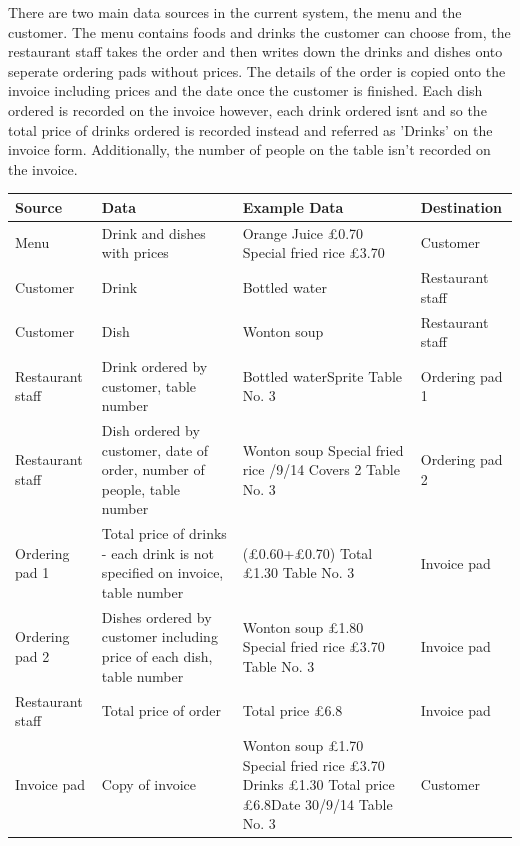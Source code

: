 There are two main data sources in the current system, the menu and the customer. The menu contains foods and drinks the customer can choose from, the restaurant staff takes the order and  then writes down the drinks and dishes onto seperate ordering pads without prices. The details of the order is copied onto the invoice including prices and the date once the customer is finished. Each dish ordered is recorded on the invoice however, each drink ordered isnt and so the total price of drinks ordered is recorded instead and referred as 'Drinks' on the invoice form. Additionally, the number of people on the table isn't recorded on the invoice.
\begin{center}

\begin{tabular}{ | p{2cm} | p{3cm} | p{3cm} | p{2cm} |  }
    \hline
    \textbf{Source} & \textbf{Data} & \textbf{Example Data} & \textbf{Destination} \\ \hline
    Menu & Drink and dishes with prices &Orange Juice £0.70 \newline Special fried rice £3.70 & Customer \\ \hline
    Customer & Drink &Bottled water &Restaurant staff \\ \hline
    Customer & Dish &Wonton soup&Restaurant staff \\ \hline
   Restaurant staff &Drink ordered by customer, table number &Bottled water\newline Sprite \newline Table No. 3 & Ordering pad 1 \\ \hline
   Restaurant staff &Dish ordered by customer, date of order, number of people, table number&Wonton soup \newline Special fried rice \newline 30/9/14 \newline Covers 2 \newline Table No. 3& Ordering pad 2 \\ \hline
   Ordering pad 1 &Total price of drinks - each drink is not specified on invoice, \newline table number &(£0.60+£0.70) \newline Total £1.30 \newline Table No. 3 & Invoice pad \\ \hline
   Ordering pad 2 &Dishes ordered by customer including price of each dish, \newline table number & Wonton soup £1.80 \newline Special fried rice £3.70 \newline Table No. 3  & Invoice pad \\ \hline
   Restaurant staff & Total price of order & Total price £6.8 & Invoice pad \\ \hline
   Invoice pad& Copy of invoice & Wonton soup £1.70 \newline Special fried rice £3.70 \newline  Drinks £1.30 \newline Total price £6.8\newline  Date 30/9/14   \newline Table No. 3& Customer \\ \hline


\end{tabular}
\end{center}
